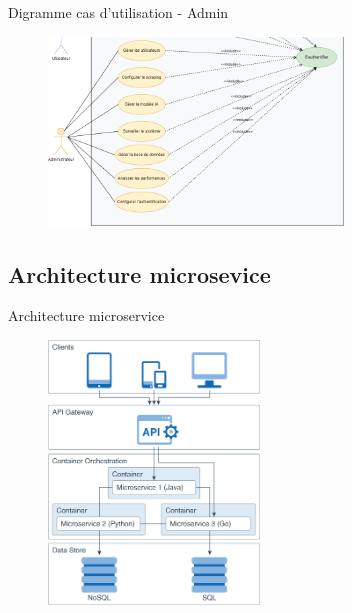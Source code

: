 \begin{frame}{Digramme cas d'utilisation - Admin}
    \begin{figure}[H]
        \centering
        \includegraphics[height=5cm]{assets/images/usecase-admin.png}
    \end{figure}
\end{frame}

\subsection{Architecture microsevice}

\begin{frame}{Architecture microservice}
    \begin{figure}[H]
        \centering
        \includegraphics[height=7cm]{assets/images/microservice_arch.png}
    \end{figure}
\end{frame}




